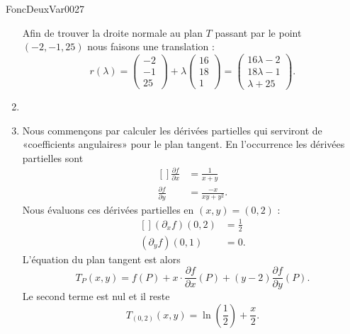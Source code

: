 \begin{corrige}{FoncDeuxVar0027}
\begin{enumerate}
			Afin de trouver la droite normale au plan $T$ passant par le point $(-2,-1,25)$ nous faisons une translation :
			\begin{equation}
				r(\lambda)=\begin{pmatrix}
					-2	\\ 
					-1	\\ 
					25	
				\end{pmatrix}+\lambda\begin{pmatrix}
					16	\\ 
					18	\\ 
					1	
				\end{pmatrix}=
				\begin{pmatrix}
					16\lambda-2	\\ 
					18\lambda-1	\\ 
					\lambda+25	
				\end{pmatrix}.
			\end{equation}
			
		\item
		\item
			Nous commençons par calculer les dérivées partielles qui serviront de «coefficients angulaires» pour le plan tangent. En l'occurrence les dérivées partielles sont
			\begin{equation}
				\begin{aligned}[]
					\frac{ \partial f }{ \partial x }&=\frac{1}{ x+y }\\
					\frac{ \partial f }{ \partial y }&=\frac{ -x }{ xy+y^2 }.
				\end{aligned}
			\end{equation}
			Nous évaluons ces dérivées partielles en $(x,y)=(0,2)$ :
			\begin{equation}
				\begin{aligned}[]
					(\partial_xf)(0,2)&=\frac{ 1 }{2}\\
					(\partial_yf)(0,1)&=0.
				\end{aligned}
			\end{equation}
			L'équation du plan tangent est alors
			\begin{equation}
				T_P(x,y)=f(P)+x\cdot\frac{ \partial f }{ \partial x }(P)+(y-2)\frac{ \partial f }{ \partial y }(P).
			\end{equation}
			Le second terme est nul et il reste 
			\begin{equation}
				T_{(0,2)}(x,y)=\ln\left( \frac{ 1 }{2} \right)+\frac{ x }{ 2 }.
			\end{equation}
			

\end{enumerate}
\end{corrige}
